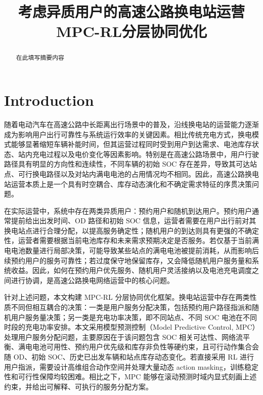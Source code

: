 \documentclass[12pt,hyperref,a4paper,UTF8]{ctexart}
\begin{document}
\cover

\newpage
\begin{abstract}

在此填写摘要内容

\end{abstract}
\newpage

\thispagestyle{empty} %

\newpage
\tableofcontents

\newpage

\begin{center}
   \title{ \Huge \textbf{{考虑异质用户的高速公路换电站运营MPC-RL分层协同优化}}}
\end{center}



\section{Introduction}
随着电动汽车在高速公路中长距离出行场景中的普及，沿线换电站的运营能力逐渐成为影响用户出行可靠性与系统运行效率的关键因素。相比传统充电方式，换电模式能够显著缩短车辆补能时间，但其运营过程同时受到用户到达需求、电池库存状态、站内充电过程以及电价变化等因素影响。特别是在高速公路场景中，用户行驶路径具有明显的方向性和连续性，不同车辆的初始 SOC 存在差异，导致其可达站点、可行换电路径以及对站内满电电池的占用情况均不相同。因此，高速公路换电站运营本质上是一个具有时空耦合、库存动态演化和不确定需求特征的序贯决策问题。

在实际运营中，系统中存在两类异质用户：预约用户和随机到达用户。预约用户通常提前给出出发时间、OD 路径和初始 SOC 信息，运营者需要在用户出行前对其换电站点进行合理分配，以提高服务确定性；随机用户的到达则具有更强的不确定性，运营者需要根据当前电池库存和未来需求预期决定是否服务。若仅基于当前满电电池数量进行局部决策，可能导致某些站点的满电电池被提前消耗，从而影响后续预约用户的服务可靠性；若过度保守地保留库存，又会降低随机用户服务量和系统收益。因此，如何在预约用户优先服务、随机用户灵活接纳以及电池充电调度之间进行协调，是高速公路换电网络运营中的核心问题。

针对上述问题，本文构建 MPC-RL 分层协同优化框架。换电站运营中存在两类性质不同但相互耦合的决策：一类是用户服务分配决策，包括预约用户路径指派和随机用户服务量决策；另一类是充电功率决策，即不同站点、不同 SOC 电池在不同时段的充电功率安排。本文采用模型预测控制（Model Predictive Control, MPC）处理用户服务分配问题，主要原因在于该问题包含 SOC 相关可达性、网络流平衡、满电电池可用性、预约用户优先级和库存非负性等硬约束，且可行动作集合会随 OD、初始 SOC、历史已出发车辆和站点库存动态变化。若直接采用 RL 进行用户指派，需要设计高维组合动作空间并处理大量动态 action masking，训练稳定性和可行性保障均较困难。相比之下，MPC 能够在滚动预测时域内显式刻画上述约束，并给出可解释、可执行的服务分配方案。
\end{document}
